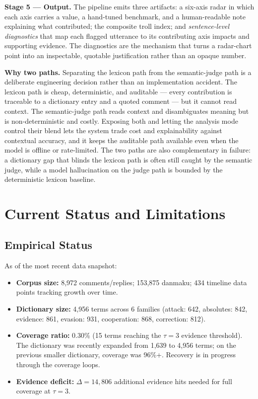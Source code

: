 \documentclass[11pt,a4paper]{article}
\begin{document}
\textbf{Stage 5 --- Output.} The pipeline emits three artifacts: a six-axis radar in which
each axis carries a value, a hand-tuned benchmark, and a human-readable note explaining what
contributed; the composite troll index; and \emph{sentence-level diagnostics} that map each
flagged utterance to its contributing axis impacts and supporting evidence. The diagnostics
are the mechanism that turns a radar-chart point into an inspectable, quotable justification
rather than an opaque number.

\textbf{Why two paths.} Separating the lexicon path from the semantic-judge path is a
deliberate engineering decision rather than an implementation accident. The lexicon path is
cheap, deterministic, and auditable --- every contribution is traceable to a dictionary entry
and a quoted comment --- but it cannot read context. The semantic-judge path reads context
and disambiguates meaning but is non-deterministic and costly. Exposing both and letting the
analysis mode control their blend lets the system trade cost and explainability against
contextual accuracy, and it keeps the auditable path available even when the model is offline
or rate-limited. The two paths are also complementary in failure: a dictionary gap that blinds
the lexicon path is often still caught by the semantic judge, while a model hallucination on
the judge path is bounded by the deterministic lexicon baseline.


\section{Current Status and Limitations}

\subsection{Empirical Status}

As of the most recent data snapshot:
\begin{itemize}
  \item \textbf{Corpus size:} 8,972 comments/replies; 153,875 danmaku; 434 timeline data
    points tracking growth over time.
  \item \textbf{Dictionary size:} 4,956 terms across 6 families (attack: 642,
    absolutes: 842, evidence: 861, evasion: 931, cooperation: 868, correction: 812).
  \item \textbf{Coverage ratio:} 0.30\% (15 terms reaching the $\tau = 3$ evidence
    threshold). The dictionary was recently expanded from 1,639 to 4,956 terms; on the
    previous smaller dictionary, coverage was 96\%+. Recovery is in progress through
    the coverage loops.
  \item \textbf{Evidence deficit:} $\Delta = 14,\!806$ additional evidence hits needed
    for full coverage at $\tau = 3$.
\end{itemize}
\end{document}
